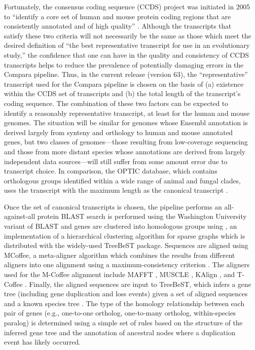 Fortunately, the consensus coding sequence (CCDS) project was
initiated in 2005 to ``identify a core set of human and mouse protein
coding regions that are consistently annotated and of high quality''
\citep{Pruitt2009}. Although the transcripts that satisfy these two
criteria will not necessarily be the same as those which meet the
desired definition of ``the best representative transcript for use in
an evolutionary study,'' the confidence that one can have in the
quality and consistency of CCDS transcripts helps to reduce the
prevalence of potentially damaging errors in the Compara pipeline.
Thus, in the current release (version 63), the ``representative''
transcript used for the Compara pipeline is chosen on the basis of (a)
existence within the CCDS set of transcripts and (b) the total length
of the transcript's coding sequence. The combination of these two
factors can be expected to identify a reasonably representative
transcript, at least for the human and mouse genomes. The situation
will be similar for genomes whose Ensembl annotation is derived
largely from synteny and orthology to human and mouse annotated genes,
but two classes of genomes---those resulting from low-coverage
sequencing and those from more distant species whose annotations are
derived from largely independent data sources---will still suffer from
some amount error due to transcript choice. In comparison, the OPTIC
database, which contains orthologous groups identified within a wide
range of animal and fungal clades, uses the transcript with the
maximum length as the canonical transcript \citep{Heger2008}.

Once the set of canonical transcripts is chosen, the \cmp pipeline
performs an all-against-all protein BLAST search is performed using
the Washington University variant of BLAST \citep{Chao1992} and genes
are clustered into homologous groups using \hclust \citep{Ruan2008},
an implementation of a hierarchical clustering algorithm for sparse
graphs which is distributed with the widely-used TreeBeST
package. Sequences are aligned using MCoffee, a meta-aligner algorithm
which combines the results from different aligners into one alignment
using a maximum-consistency criterion \citep{Wallace2006}. The
aligners used for the M-Coffee alignment include MAFFT
\citep{Katoh2005}, MUSCLE \citep{Edgar2004}, KAlign
\citep{Lassmann2009}, and T-Coffee \citep{Notredame2000}. Finally, the
aligned sequences are input to TreeBeST, which infers a gene tree
(including gene duplication and loss events) given a set of aligned
sequences and a known species tree \citep{Ruan2008}. The type of the
homology relationship between each pair of genes (e.g., one-to-one
ortholog, one-to-many ortholog, within-species paralog) is determined
using a simple set of rules based on the structure of the inferred
gene tree and the annotation of ancestral nodes where a duplication
event has likely occurred.

